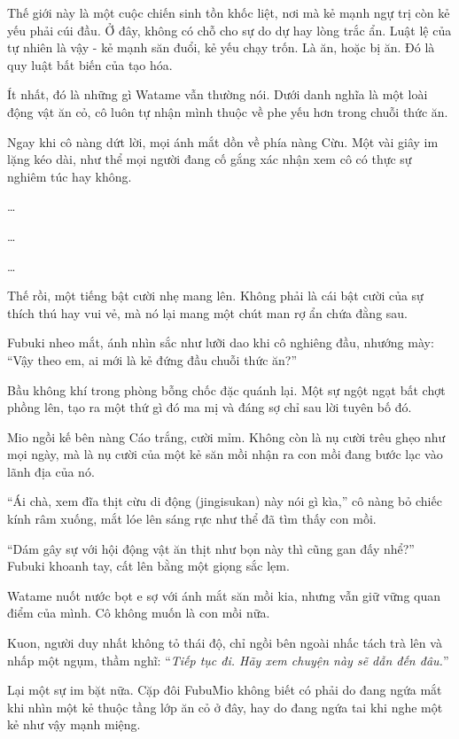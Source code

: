 \documentclass[../main.tex]{subfiles}
\begin{document}

Thế giới này là một cuộc chiến sinh tồn khốc liệt, nơi mà kẻ mạnh ngự trị còn kẻ yếu phải cúi đầu. Ở đây, không có chỗ cho sự do dự hay lòng trắc ẩn. Luật lệ của tự nhiên là vậy - kẻ mạnh săn đuổi, kẻ yếu chạy trốn. Là ăn, hoặc bị ăn. Đó là quy luật bất biến của tạo hóa.

Ít nhất, đó là những gì Watame vẫn thường nói. Dưới danh nghĩa là một loài động vật ăn cỏ, cô luôn tự nhận mình thuộc về phe yếu hơn trong chuỗi thức ăn.

Ngay khi cô nàng dứt lời, mọi ánh mắt dồn về phía nàng Cừu. Một vài giây im lặng kéo dài, như thể mọi người đang cố gắng xác nhận xem cô có thực sự nghiêm túc hay không.

\dots

\dots

\dots

Thế rồi, một tiếng bật cười nhẹ mang lên. Không phải là cái bật cười của sự thích thú hay vui vẻ, mà nó lại mang một chút man rợ ẩn chứa đằng sau.

Fubuki nheo mắt, ánh nhìn sắc như lưỡi dao khi cô nghiêng đầu, nhướng mày: ``Vậy theo em, ai mới là kẻ đứng đầu chuỗi thức ăn?''

Bầu không khí trong phòng bỗng chốc đặc quánh lại. Một sự ngột ngạt bất chợt phồng lên, tạo ra một thứ gì đó ma mị và đáng sợ chỉ sau lời tuyên bố đó.

Mio ngồi kế bên nàng Cáo trắng, cười mỉm. Không còn là nụ cười trêu ghẹo như mọi ngày, mà là nụ cười của một kẻ săn mồi nhận ra con mồi đang bước lạc vào lãnh địa của nó.

``Ái chà, xem đĩa thịt cừu di động (jingisukan) này nói gì kìa,'' cô nàng bỏ chiếc kính râm xuống, mắt lóe lên sáng rực như thể đã tìm thấy con mồi.

``Dám gây sự với hội động vật ăn thịt như bọn này thì cũng gan đấy nhể?'' Fubuki khoanh tay, cất lên bằng một giọng sắc lẹm.


Watame nuốt nước bọt e sợ với ánh mắt săn mồi kia, nhưng vẫn giữ vững quan điểm của mình. Cô không muốn là con mồi nữa.

Kuon, người duy nhất không tỏ thái độ, chỉ ngồi bên ngoài nhấc tách trà lên và nhấp một ngụm, thầm nghĩ: ``\textit{Tiếp tục đi. Hãy xem chuyện này sẽ dẫn đến đâu.}''

Lại một sự im bặt nữa. Cặp đôi FubuMio không biết có phải do đang ngứa mắt khi nhìn một kẻ thuộc tầng lớp ăn cỏ ở đây, hay do đang ngứa tai khi nghe một kẻ như vậy mạnh miệng.
\end{document}
